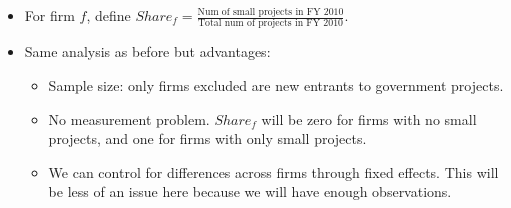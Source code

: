 \documentclass[
]{article}
\providecommand{\tightlist}{%
  \setlength{\itemsep}{0pt}\setlength{\parskip}{0pt}}
\begin{document}
\begin{itemize}
\tightlist
\item
  For firm \(f\), define
  \(Share_f = \frac{\text{Num of small projects in FY 2010}}{\text{Total num of projects in FY 2010}}\).
\item
  Same analysis as before but advantages:

  \begin{itemize}
  \tightlist
  \item
    Sample size: only firms excluded are new entrants to government
    projects.
  \item
    No measurement problem. \(Share_f\) will be zero for firms with no
    small projects, and one for firms with only small projects.
  \item
    We can control for differences across firms through fixed effects.
    This will be less of an issue here because we will have enough
    observations.
  \end{itemize}
\end{itemize}
\end{document}
